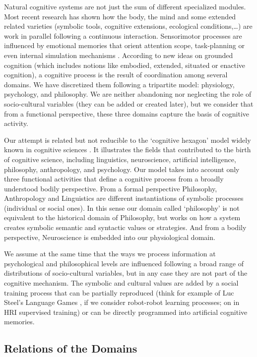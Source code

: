 Natural cognitive systems are not just the sum of different specialized
modules. Most recent research has shown how the body, the mind and some
extended related varieties (symbolic tools, cognitive extensions,
ecological conditions,\ldots{}) are work in parallel following a
continuous interaction. Sensorimotor processes are influenced by
emotional memories that orient attention scope, task-planning or even
internal simulation mechanisms \cite{ferraz2009}. According to new ideas
on grounded cognition (which includes notions like embodied, extended,
situated or enactive cognition), a cognitive process is the result of
coordination among several domains. We have discretized them following a
tripartite model: physiology, psychology, and philosophy. We are neither
abandoning nor neglecting the role of socio-cultural variables (they can
be added or created later), but we consider that from a functional
perspective, these three domains capture the basis of cognitive
activity.

Our attempt is related but not reducible to the `cognitive hexagon'
model widely known in cognitive sciences \cite{miller2003}. It
illustrates the fields that contributed to the birth of cognitive
science, including linguistics, neuroscience, artificial intelligence,
philosophy, anthropology, and psychology. Our model takes into account
only three functional activities that define a cognitive process from a
broadly understood bodily perspective. From a formal perspective
Philosophy, Anthropology and Linguistics are different instantiations of
symbolic processes (individual or social ones). In this sense our domain
called `philosophy' is not equivalent to the historical domain of
Philosophy, but works on how a system creates symbolic semantic and
syntactic values or strategies. And from a bodily perspective,
Neuroscience is embedded into our physiological domain.

We assume at the same time that the ways we process information at
psychological and philosophical levels are influenced following a broad
range of distributions of socio-cultural variables, but in any case they
are not part of the cognitive mechanism. The symbolic and cultural
values are added by a social training process that can be partially
reproduced (think for example of Luc Steel's Language Games
\cite{steels}, if we consider robot-robot learning processes; on in HRI
supervised training) or can be directly programmed into artificial
cognitive memories.

\subsection{Relations of the Domains}\label{relations-of-the-domains}

